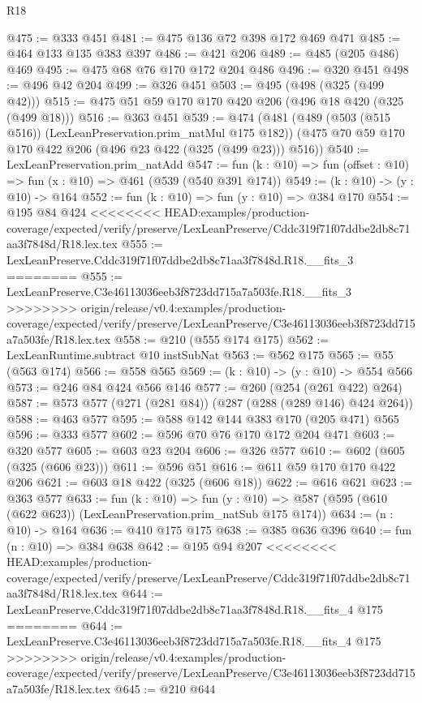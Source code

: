 \begin{lexlean}{R18}
\begin{coremodule}
{{{{{{{{{{{{{@475 := @333 @451
@481 := @475 @136 @72 @398 @172 @469 @471
@485 := @464 @133 @135 @383 @397
@486 := @421 @206
@489 := @485 (@205 @486) @469
@495 := @475 @68 @76 @170 @172 @204 @486
@496 := @320 @451
@498 := @496 @42 @204
@499 := @326 @451
@503 := @495 (@498 (@325 (@499 @42)))
@515 := @475 @51 @59 @170 @170 @420 @206 (@496 @18 @420 (@325 (@499 @18)))
@516 := @363 @451
@539 := @474
    (@481
      (@489 (@503 (@515 @516)) (LexLeanPreservation.prim_natMul @175 @182))
      (@475 @70 @59 @170 @170 @422 @206 (@496 @23 @422 (@325 (@499 @23))) @516))
@540 := LexLeanPreservation.prim_natAdd
@547 := fun (k : @10) => fun (offset : @10) => fun (x : @10) => @461 (@539 (@540 @391 @174))
@549 := (k : @10) -> (y : @10) -> @164
@552 := fun (k : @10) => fun (y : @10) => @384 @170
@554 := @195 @84 @424
<<<<<<<< HEAD:examples/production-coverage/expected/verify/preserve/LexLeanPreserve/Cddc319f71f07ddbe2db8c71aa3f7848d/R18.lex.tex
@555 := LexLeanPreserve.Cddc319f71f07ddbe2db8c71aa3f7848d.R18.__fits_3
========
@555 := LexLeanPreserve.C3e46113036eeb3f8723dd715a7a503fe.R18.__fits_3
>>>>>>>> origin/release/v0.4:examples/production-coverage/expected/verify/preserve/LexLeanPreserve/C3e46113036eeb3f8723dd715a7a503fe/R18.lex.tex
@558 := @210 (@555 @174 @175)
@562 := LexLeanRuntime.subtract @10 instSubNat
@563 := @562 @175
@565 := @55 (@563 @174)
@566 := @558 @565
@569 := (k : @10) -> (y : @10) -> @554 @566
@573 := @246 @84 @424 @566 @146
@577 := @260 (@254 (@261 @422) @264)
@587 := @573 @577 (@271 (@281 @84)) (@287 (@288 (@289 @146) @424 @264))
@588 := @463 @577
@595 := @588 @142 @144 @383 @170 (@205 @471) @565
@596 := @333 @577
@602 := @596 @70 @76 @170 @172 @204 @471
@603 := @320 @577
@605 := @603 @23 @204
@606 := @326 @577
@610 := @602 (@605 (@325 (@606 @23)))
@611 := @596 @51
@616 := @611 @59 @170 @170 @422 @206
@621 := @603 @18 @422 (@325 (@606 @18))
@622 := @616 @621
@623 := @363 @577
@633 := fun (k : @10) =>
  fun (y : @10) => @587 (@595 (@610 (@622 @623)) (LexLeanPreservation.prim_natSub @175 @174))
@634 := (n : @10) -> @164
@636 := @410 @175 @175
@638 := @385 @636 @396
@640 := fun (n : @10) => @384 @638
@642 := @195 @94 @207
<<<<<<<< HEAD:examples/production-coverage/expected/verify/preserve/LexLeanPreserve/Cddc319f71f07ddbe2db8c71aa3f7848d/R18.lex.tex
@644 := LexLeanPreserve.Cddc319f71f07ddbe2db8c71aa3f7848d.R18.__fits_4 @175
========
@644 := LexLeanPreserve.C3e46113036eeb3f8723dd715a7a503fe.R18.__fits_4 @175
>>>>>>>> origin/release/v0.4:examples/production-coverage/expected/verify/preserve/LexLeanPreserve/C3e46113036eeb3f8723dd715a7a503fe/R18.lex.tex
@645 := @210 @644
}}}}}}}}}}}}}
\end{coremodule}
\end{lexlean}
